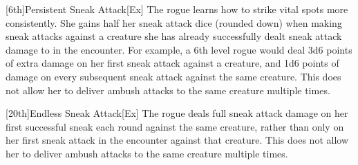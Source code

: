[6th]{Persistent Sneak Attack}[Ex]
The rogue learns how to strike vital spots more consistently.
She gains half her sneak attack dice (rounded down) when making sneak attacks against a creature she has already successfully dealt sneak attack damage to in the encounter.
For example, a 6th level rogue would deal 3d6 points of extra damage on her first sneak attack against a creature, and 1d6 points of damage on every subsequent sneak attack against the same creature.
This does not allow her to deliver ambush attacks to the same creature multiple times.

[20th]{Endless Sneak Attack}[Ex]
The rogue deals full sneak attack damage on her first successful sneak each round against the same creature, rather than only on her first sneak attack in the encounter against that creature.
This does not allow her to deliver ambush attacks to the same creature multiple times.

